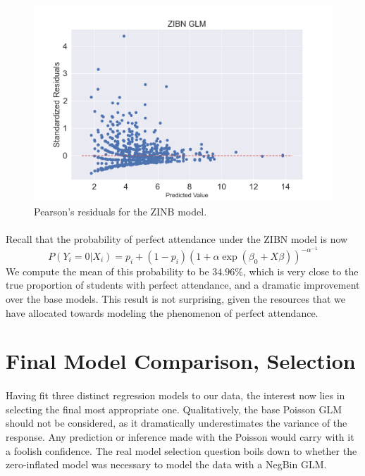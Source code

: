 \documentclass[12pt, titlepage]{article}
\begin{document}
	\begin{figure}[h!]
	\centering
	\includegraphics[width = \textwidth]{fig/ZIBNresid.png}
	\caption{Pearson's residuals for the ZINB model.}
	\label{ZINBresid}
	\end{figure}

	\paragraph{} Recall that the probability of perfect attendance under the ZIBN model is now
	$$
	P(Y_i = 0 | X_i) = p_i + (1-p_i)(1 + \alpha \exp(\beta_0 + X\beta))^{-\alpha^{-1}}
	$$
	We compute the mean of this probability to be $34.96\%$, which is very close to the true proportion of students with perfect attendance, and a dramatic improvement over the base models. This result is not surprising, given the resources that we have allocated towards modeling the phenomenon of perfect attendance. 
	
	\section{Final Model Comparison, Selection}
	
	\paragraph{} Having fit three distinct regression models to our data, the interest now lies in selecting the final most appropriate one. Qualitatively, the base Poisson GLM should not be considered, as it dramatically underestimates the variance of the response. Any prediction or inference made with the Poisson would carry with it a foolish confidence. The real model selection question boils down to whether the zero-inflated model was necessary to model the data with a NegBin GLM.
	
\end{document}
